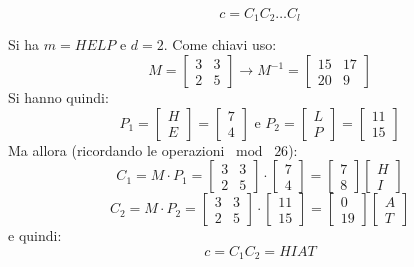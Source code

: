 \documentclass[a4paper,12pt, oneside]{book}
\begin{document}
\[c=C_1C_2\ldots C_l\]
\begin{esempio}
  Si ha $m=HELP$ e $d=2$. Come chiavi uso:
  \[M=\left[
      \begin{matrix}
        3 & 3\\
        2 & 5
      \end{matrix}
    \right]\to M^{-1}=\left[
      \begin{matrix}
        15 & 17\\
        20 & 9
      \end{matrix}
    \right]
  \]
  Si hanno quindi:
  \[P_1=
    \left[
      \begin{matrix}
        H\\
        E
      \end{matrix}
    \right]=\left[
      \begin{matrix}
        7\\
        4
      \end{matrix}
    \right]\mbox{ e }
    P_2=\left[
      \begin{matrix}
        L\\
        P
      \end{matrix}
    \right]=\left[
      \begin{matrix}
        11\\
        15
      \end{matrix}
    \right]
  \]
  Ma allora (ricordando le operazioni $\bmod \,\,26$):
  \[C_1=M\cdot P_1=\left[
      \begin{matrix}
        3 & 3\\
        2 & 5
      \end{matrix}
    \right]\cdot\left[
      \begin{matrix}
        7\\
        4
      \end{matrix}
    \right]=\left[
      \begin{matrix}
        7\\
        8
      \end{matrix}
    \right]\left[
      \begin{matrix}
        H\\
        I
      \end{matrix}
    \right]\]
  \[C_2=M\cdot P_2=\left[
      \begin{matrix}
        3 & 3\\
        2 & 5
      \end{matrix}
    \right]\cdot\left[
      \begin{matrix}
        11\\
        15
      \end{matrix}
    \right]=\left[
      \begin{matrix}
        0\\
        19
      \end{matrix}
    \right]\left[
      \begin{matrix}
        A\\
        T
      \end{matrix}
    \right]\]
  e quindi:
  \[c=C_1C_2=HIAT\]
\end{esempio}
\end{document}
